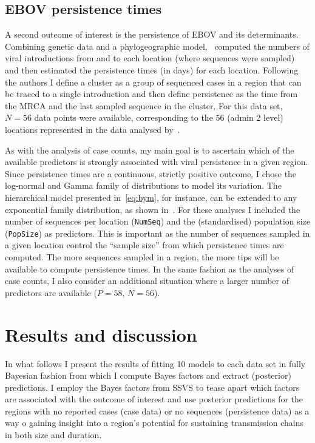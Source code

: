 \subsection*{EBOV persistence times}

A second outcome of interest is the persistence of EBOV and its determinants.
Combining genetic data and a phylogeographic model,~\cite{Dudas2017} computed the numbers of viral introductions from and to each location (where sequences were sampled) and then estimated the persistence times (in days) for each location.
Following the authors I define a cluster as a group of sequenced cases in a region that can be traced to a single introduction and then define persistence as the time from the MRCA and the last sampled sequence in the cluster.
For this data set, $N = 56$ data points were available, corresponding to the $56$ (admin 2 level) locations represented in the data analysed by~\cite{Dudas2017}. 

As with the analysis of case counts, my main goal is to ascertain which of the available predictors is strongly associated with viral persistence in a given region.
Since persistence times are a continuous, strictly positive outcome, I chose the log-normal and Gamma family of distributions to model its variation.
The hierarchical model presented in~\ref{eq:bym}, for instance, can be extended to any exponential family distribution, as shown in~\cite[Sec. 5.5]{Banerjee2003}.
For these analyses I included the number of sequences per location (\verb|NumSeq|) and the (standardised) population size (\verb|PopSize|) as predictors.
This is important as the number of sequences sampled in a given location control the ``sample size'' from which persistence times are computed.
The more sequences sampled in a region, the more tips will be available to compute persistence times.
In the same fashion as the analyses of case counts, I also consider an additional situation where a larger number of predictors are available ($P = 58$, $N = 56$).
 
\section{Results and discussion}

In what follows I present the results of fitting 10 models to each data set in fully Bayesian fashion from which I compute Bayes factors and extract (posterior) predictions.
I employ the Bayes factors from SSVS to tease apart which factors are associated with the outcome of interest and use posterior predictions for the regions with no reported cases (case data) or no sequences (persistence data) as a way o gaining insight into a region's potential for sustaining transmission chains in both size and duration.


